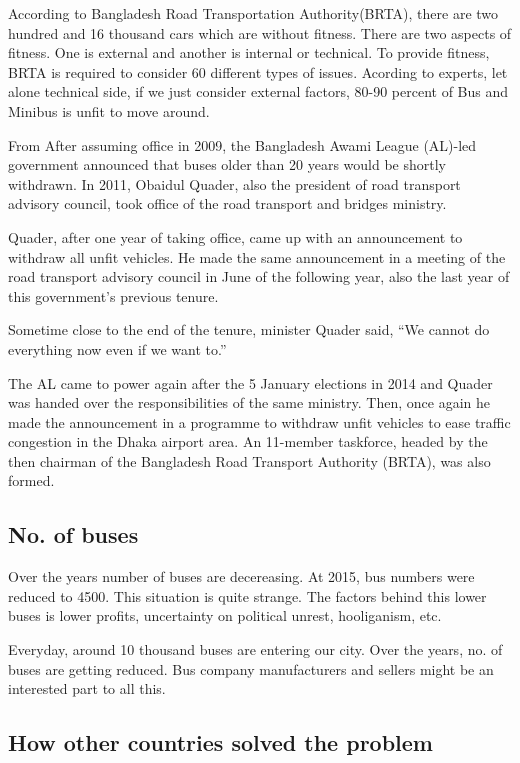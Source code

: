 \documentclass[11pt,]{article}
\begin{document}
According to Bangladesh Road Transportation
Authority(BRTA)\autocite{anwar_palo_respite_2018}, there are two hundred
and 16 thousand cars which are without fitness. There are two aspects of
fitness. One is external and another is internal or technical. To
provide fitness, BRTA is required to consider 60 different types of
issues. Acording to experts, let alone technical side, if we just
consider external factors, 80-90 percent of Bus and Minibus is unfit to
move around.

From \autocite{anwar_palo_words_2018} After assuming office in 2009, the
Bangladesh Awami League (AL)-led government announced that buses older
than 20 years would be shortly withdrawn. In 2011, Obaidul Quader, also
the president of road transport advisory council, took office of the
road transport and bridges ministry.

Quader, after one year of taking office, came up with an announcement to
withdraw all unfit vehicles. He made the same announcement in a meeting
of the road transport advisory council in June of the following year,
also the last year of this government's previous tenure.

Sometime close to the end of the tenure, minister Quader said, ``We
cannot do everything now even if we want to.''

The AL came to power again after the 5 January elections in 2014 and
Quader was handed over the responsibilities of the same ministry. Then,
once again he made the announcement in a programme to withdraw unfit
vehicles to ease traffic congestion in the Dhaka airport area. An
11-member taskforce, headed by the then chairman of the Bangladesh Road
Transport Authority (BRTA), was also formed.

\subsection{No. of buses}\label{no.-of-buses}

Over the years number of buses are decereasing. At 2015, bus numbers
were reduced to 4500. This situation is quite strange. The factors
behind this lower buses is lower profits, uncertainty on political
unrest, hooliganism, etc.

Everyday, around 10 thousand buses are entering our city. Over the
years, no. of buses are getting reduced. Bus company manufacturers and
sellers might be an interested part to all this.

\subsection{How other countries solved the
problem}\label{how-other-countries-solved-the-problem}
\end{document}
